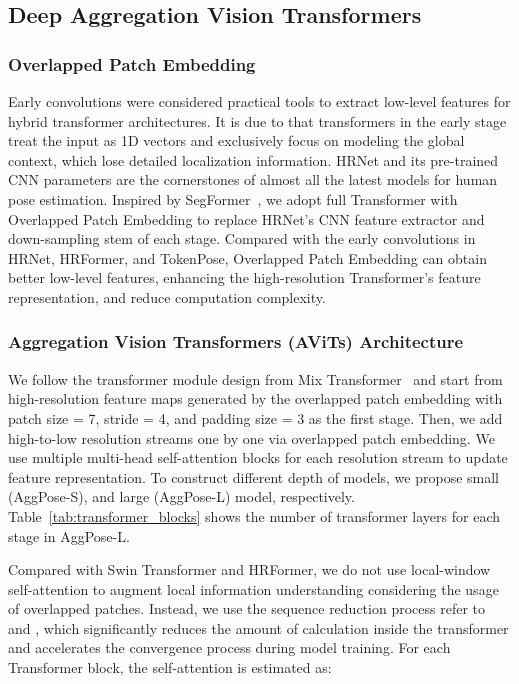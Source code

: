 \documentclass{article}
\begin{document}
\subsection{Deep Aggregation Vision Transformers}

\subsubsection{Overlapped Patch Embedding} 
Early convolutions were considered practical tools to extract low-level features for hybrid transformer architectures. It is due to that transformers in the early stage treat the input as 1D vectors and exclusively focus on modeling the global context, which lose detailed localization information. HRNet and its pre-trained CNN parameters are the cornerstones of almost all the latest models for human pose estimation. Inspired by SegFormer~\cite{xie2021segformer}, we adopt full Transformer with Overlapped Patch Embedding to replace HRNet's CNN feature extractor and down-sampling stem of each stage. Compared with the early convolutions in HRNet, HRFormer, and TokenPose, Overlapped Patch Embedding can obtain better low-level features, enhancing the high-resolution Transformer's feature representation, and reduce computation complexity.

\subsubsection{Aggregation Vision Transformers (AViTs) Architecture} 
We follow the transformer module design from Mix Transformer~\cite{xie2021segformer} and start from high-resolution feature maps generated by the overlapped patch embedding with patch size = 7, stride = 4, and padding size = 3 as the first stage. Then, we add high-to-low resolution streams one by one via overlapped patch embedding. We use multiple multi-head self-attention blocks for each resolution stream to update feature representation. To construct different depth of models, we propose small (AggPose-S), and large (AggPose-L) model, respectively. Table~\ref{tab:transformer_blocks} shows the number of transformer layers for each stage in AggPose-L.

Compared with Swin Transformer and HRFormer, we do not use local-window self-attention to augment local information understanding considering the usage of overlapped patches. Instead, we use the sequence reduction process refer to \cite{xie2021segformer} and \cite{wang2021pyramid}, which significantly reduces the amount of calculation inside the transformer and accelerates the convergence process during model training. For each Transformer block, the self-attention is estimated as:
\end{document}
